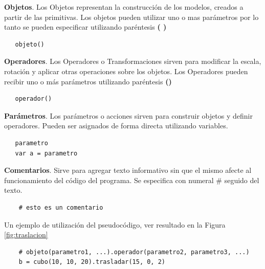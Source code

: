 \textbf{Objetos}. Los Objetos representan la construcción de los modelos, creados a partir  de las primitivas. Los objetos pueden utilizar uno o mas parámetros por lo tanto se pueden especificar utilizando paréntesis \textbf{( )}

\begin{verbatim}
   objeto()
\end{verbatim}


\textbf{Operadores}. Los Operadores o Transformaciones sirven para modificar la escala, rotación y aplicar otras operaciones sobre los objetos. Los Operadores pueden recibir uno o más parámetros utilizando paréntesis \textbf{()}

\begin{verbatim}
   operador()
\end{verbatim}


\textbf{Parámetros}. Los parámetros o acciones sirven para construir objetos y definir operadores. Pueden ser asignados de forma directa utilizando variables.

\begin{verbatim}
   parametro
   var a = parametro
\end{verbatim}

\textbf{Comentarios}. Sirve para agregar texto informativo sin que el mismo afecte al funcionamiento del código del programa. Se especifica con numeral \# seguido del texto.
\begin{verbatim}
    # esto es un comentario
\end{verbatim}

\vspace{5mm}
Un ejemplo de utilización del pseudocódigo, ver resultado en la Figura \ref{fig:traslacion}

\begin{verbatim}
    # objeto(parametro1, ...).operador(parametro2, parametro3, ...)
    b = cubo(10, 10, 20).trasladar(15, 0, 2) 
\end{verbatim}


\clearpage
